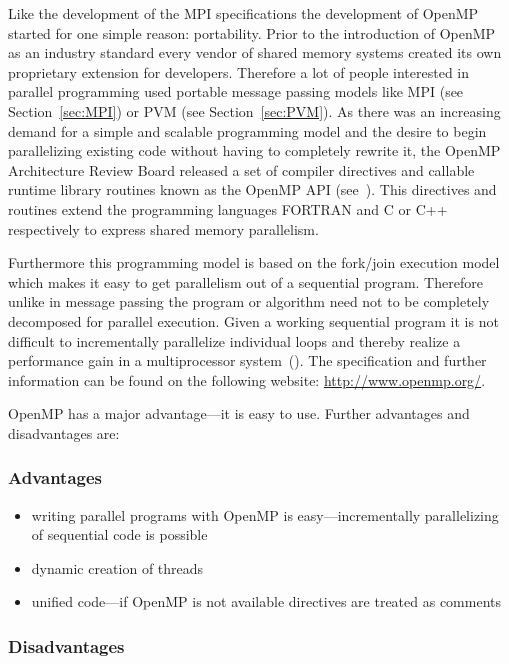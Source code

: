 Like the development of the MPI specifications the development
of OpenMP started for one simple reason: portability. Prior to the
introduction of OpenMP as an industry standard every vendor of shared
memory systems created its own proprietary extension for
developers. Therefore a lot of people interested in parallel
programming used portable message passing models like MPI (see
Section~\ref{sec:MPI}) or PVM (see Section~\ref{sec:PVM}). As there
was an increasing demand for a simple and scalable programming model and
the desire to begin parallelizing existing code without having to
completely rewrite it, the OpenMP Architecture Review Board released a
set of compiler directives and callable runtime library routines
known as the OpenMP API (see~\cite{openMP05}). This directives and
routines extend the
programming languages FORTRAN and C or C++ respectively to express
shared memory parallelism.

Furthermore this programming model is based on the fork/join execution
model which makes it easy to get parallelism out of a sequential
program. Therefore unlike in message passing the program or algorithm
need not to be completely decomposed for parallel execution. Given a
working sequential program it is not difficult to incrementally
parallelize individual loops and thereby realize a performance gain in
a multiprocessor system~(\cite{dagum1997opi}). The specification and
further information can be found on the following website:
\url{http://www.openmp.org/}.


OpenMP has a major advantage---it is easy to use. Further advantages
and disadvantages are:

\subsubsection{Advantages}

\begin{itemize}
\item writing parallel programs with OpenMP is easy---incrementally
  parallelizing of sequential code is possible
\item dynamic creation of threads
\item unified code---if OpenMP is not available directives are
  treated as comments 
\end{itemize}

\subsubsection{Disadvantages}


